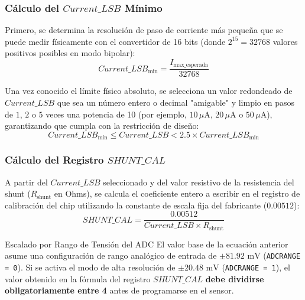\documentclass[
10pt, %
a4paper, %
oneside, %
headinclude,footinclude, %
BCOR5mm, %
]{scrartcl}
\begin{document}
\subsubsection{Cálculo del $Current\_LSB$ Mínimo}
Primero, se determina la resolución de paso de corriente más pequeña que se puede medir físicamente con el convertidor de 16 bits (donde $2^{15} = 32768$ valores positivos posibles en modo bipolar):
\begin{equation}
	Current\_LSB_{\text{min}} = \frac{I_{\text{max\_esperada}}}{32768}
\end{equation}

Una vez conocido el límite físico absoluto, se selecciona un valor redondeado de $Current\_LSB$ que sea un número entero o decimal "amigable" y limpio en pasos de $1$, $2$ o $5$ veces una potencia de 10 (por ejemplo, $10\,\mu\text{A}$, $20\,\mu\text{A}$ o $50\,\mu\text{A}$), garantizando que cumpla con la restricción de diseño:
\begin{equation}
	Current\_LSB_{\text{min}} \le Current\_LSB < 2.5 \times Current\_LSB_{\text{min}}
\end{equation}

\subsubsection{Cálculo del Registro $SHUNT\_CAL$}
A partir del $Current\_LSB$ seleccionado y del valor resistivo de la resistencia del shunt ($R_{\text{shunt}}$ en Ohms), se calcula el coeficiente entero a escribir en el registro de calibración del chip utilizando la constante de escala fija del fabricante ($0.00512$):
\begin{equation}
	SHUNT\_CAL = \frac{0.00512}{Current\_LSB \times R_{\text{shunt}}}
\end{equation}

\begin{WarningBox}{Escalado por Rango de Tensión del ADC}
	El valor base de la ecuación anterior asume una configuración de rango analógico de entrada de $\pm 81.92\text{ mV}$ (\texttt{ADCRANGE = 0}). Si se activa el modo de alta resolución de $\pm 20.48\text{ mV}$ (\texttt{ADCRANGE = 1}), el valor obtenido en la fórmula del registro $SHUNT\_CAL$ \textbf{debe dividirse obligatoriamente entre 4} antes de programarse en el sensor.
\end{WarningBox}
\end{document}
